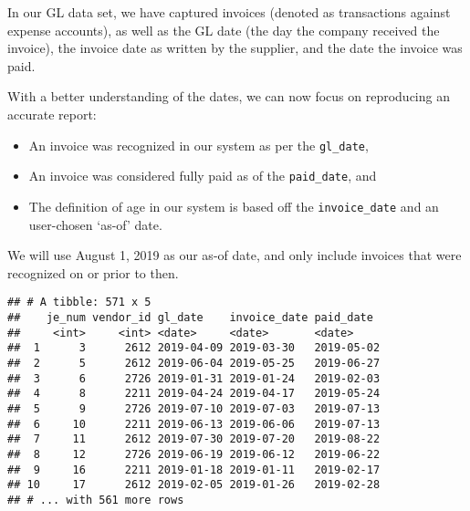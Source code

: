 \documentclass[
]{book}
\newenvironment{Shaded}{\begin{snugshade}}{\end{snugshade}}
\newcommand{\CommentTok}[1]{\textcolor[rgb]{0.56,0.35,0.01}{\textit{#1}}}
\newcommand{\KeywordTok}[1]{\textcolor[rgb]{0.13,0.29,0.53}{\textbf{#1}}}
\newcommand{\NormalTok}[1]{#1}
\newcommand{\OperatorTok}[1]{\textcolor[rgb]{0.81,0.36,0.00}{\textbf{#1}}}
\newcommand{\StringTok}[1]{\textcolor[rgb]{0.31,0.60,0.02}{#1}}
\providecommand{\tightlist}{%
  \setlength{\itemsep}{0pt}\setlength{\parskip}{0pt}}
\begin{document}
In our GL data set, we have captured invoices (denoted as transactions against expense accounts), as well as the GL date (the day the company received the invoice), the invoice date as written by the supplier, and the date the invoice was paid.

With a better understanding of the dates, we can now focus on reproducing an accurate report:

\begin{itemize}
\tightlist
\item
  An invoice was recognized in our system as per the \texttt{gl\_date},
\item
  An invoice was considered fully paid as of the \texttt{paid\_date}, and
\item
  The definition of age in our system is based off the \texttt{invoice\_date} and an user-chosen `as-of' date.
\end{itemize}

We will use August 1, 2019 as our as-of date, and only include invoices that were recognized on or prior to then.

\begin{Shaded}
\end{Shaded}

\begin{verbatim}
## # A tibble: 571 x 5
##    je_num vendor_id gl_date    invoice_date paid_date 
##     <int>     <int> <date>     <date>       <date>    
##  1      3      2612 2019-04-09 2019-03-30   2019-05-02
##  2      5      2612 2019-06-04 2019-05-25   2019-06-27
##  3      6      2726 2019-01-31 2019-01-24   2019-02-03
##  4      8      2211 2019-04-24 2019-04-17   2019-05-24
##  5      9      2726 2019-07-10 2019-07-03   2019-07-13
##  6     10      2211 2019-06-13 2019-06-06   2019-07-13
##  7     11      2612 2019-07-30 2019-07-20   2019-08-22
##  8     12      2726 2019-06-19 2019-06-12   2019-06-22
##  9     16      2211 2019-01-18 2019-01-11   2019-02-17
## 10     17      2612 2019-02-05 2019-01-26   2019-02-28
## # ... with 561 more rows
\end{verbatim}
\end{document}
